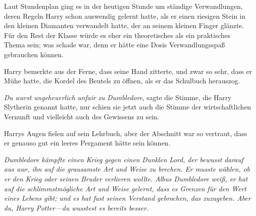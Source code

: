 Laut Stundenplan ging es in der heutigen Stunde um ständige Verwandlungen, deren Regeln Harry schon auswendig gelernt hatte, als er einen riesigen Stein in den kleinen Diamanten verwandelt hatte, der an seinem kleinen Finger glänzte. Für den Rest der Klasse würde es eher ein theoretisches als ein praktisches Thema sein; was schade war, denn er hätte eine Dosis Verwandlungsspaß gebrauchen können.

Harry bemerkte aus der Ferne, dass seine Hand zitterte, und zwar so sehr, dass er Mühe hatte, die Kordel des Beutels zu öffnen, als er das Schulbuch herauszog.

\emph{Du warst ungeheuerlich unfair zu Dumbledore}, sagte die Stimme, die Harry Slytherin genannt hatte, nur schien sie jetzt auch die Stimme der wirtschaftlichen Vernunft und vielleicht auch des Gewissens zu sein.

Harrys Augen fielen auf sein Lehrbuch, aber der Abschnitt war so vertraut, dass er genauso gut ein leeres Pergament hätte sein können.

\emph{Dumbledore kämpfte einen Krieg gegen einen Dunklen Lord, der bewusst darauf aus war, ihn auf die grausamste Art und Weise zu brechen. Er musste wählen, ob er den Krieg oder seinen Bruder verlieren wollte. Albus Dumbledore weiß, er hat auf die schlimmstmögliche Art und Weise gelernt, dass es Grenzen für den Wert eines Lebens gibt; und es hat fast seinen Verstand gebrochen, das zuzugeben. Aber du, Harry Potter—\emph{du} wusstest es bereits besser.}

